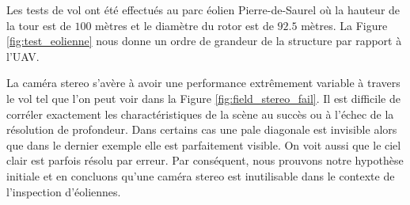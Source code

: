 Les tests de vol ont été effectués au parc éolien Pierre-de-Saurel où la hauteur de la tour est de $100$ mètres et le diamètre du rotor est de $92.5$ mètres. La Figure \ref{fig:test_eolienne} nous donne un ordre de grandeur de la structure par rapport à l'UAV.

%

La caméra stereo s'avère à avoir une performance extrêmement variable à travers le vol tel que l'on peut voir dans la Figure \ref{fig:field_stereo_fail}. Il est difficile de corréler exactement les charactéristiques de la scène au succès ou à l'échec de la résolution de profondeur. Dans certains cas une pale diagonale est invisible alors que dans le dernier exemple elle est parfaitement visible. On voit aussi que le ciel clair est parfois résolu par erreur. Par conséquent, nous prouvons notre hypothèse initiale et en concluons qu'une caméra stereo est inutilisable dans le contexte de l'inspection d'éoliennes.

